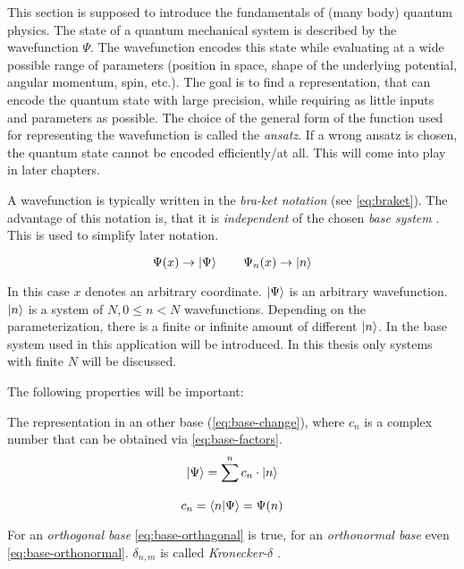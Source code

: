 This section is supposed to introduce the fundamentals of (many body) quantum physics.
The state of a quantum mechanical system is described by the wavefunction $\Psi$. 
The wavefunction encodes this state while evaluating at a wide possible range of parameters (position in space, shape of the underlying potential, angular momentum, spin, etc.).
The goal is to find a representation, that can encode the quantum state with large precision, while requiring as little inputs and parameters as possible. The choice of the general form of the function used for representing the wavefunction is called the \emph{ansatz}. 
If a wrong ansatz is chosen, the quantum state cannot be encoded efficiently/at all. This will come into play in later chapters.

A wavefunction is typically written in the \emph{bra-ket notation} (see \autoref{eq:braket}). The advantage of this notation is, that it is \emph{independent} of the chosen \emph{base system} \cite[]{schwablQM}. This is used to simplify later notation.  

\begin{equation}
    \label{eq:braket}
    \Psi(x) \rightarrow \ket{\Psi} \qquad \Psi_n(x) \rightarrow \ket{n}
\end{equation}

In this case $x$ denotes an arbitrary coordinate. $\ket{\Psi}$ is an arbitrary wavefunction. $\ket{n}$ is a system of $N, 0\leq n< N$ wavefunctions. Depending on the parameterization, there is a finite or infinite amount of different $\ket{n}$. In  the base system used in this application will be introduced. In this thesis only systems with finite $N$ will be discussed.

The following properties will be important:

The representation in an other base (\autoref{eq:base-change}), where $c_n$ is a complex number that can be obtained via \autoref{eq:base-factors}.
\begin{equation}
    \label{eq:base-change}
    \ket{\Psi} = \sum\limits_{}^{n} c_n \cdot \ket{n}
\end{equation}
\begin{equation}
    \label{eq:base-factors}
    c_n = \bra{n}\ket{\Psi} = \Psi(n)
\end{equation}

For an \emph{orthogonal base} \autoref{eq:base-orthagonal} is true, for an \emph{orthonormal base} even \autoref{eq:base-orthonormal}. $\delta_{n, m}$ is called \emph{Kronecker-$\delta$} \cite{schwablQM}.

